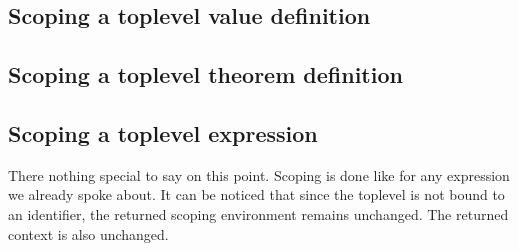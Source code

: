 \subsection{Scoping a toplevel value definition}

\subsection{Scoping a toplevel theorem definition}

\subsection{Scoping a toplevel expression}
There nothing special to say on this point. Scoping is done like for
any expression we already spoke about. It can be noticed that since
the toplevel is not bound to an identifier, the returned scoping
environment remains unchanged. The returned context is also
unchanged.